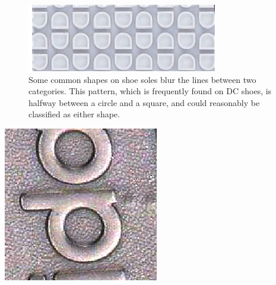 \documentclass[10pt]{article}
\begin{document}

\begin{figure}
\includegraphics[width=\linewidth]{dc_circle_quad.png}
\caption{Some common shapes on shoe soles blur the lines between two categories. This pattern, which is frequently found on DC shoes, is halfway between a circle and a square, and could reasonably be classified as either shape.}\label{fig:dc-shoe}
\end{figure}

\begin{minipage}{.4\linewidth}
\includegraphics[width=\linewidth]{adidas-test.jpg}
\end{minipage}\hfill\begin{minipage}{.49\linewidth}
\end{minipage}
\end{document}
